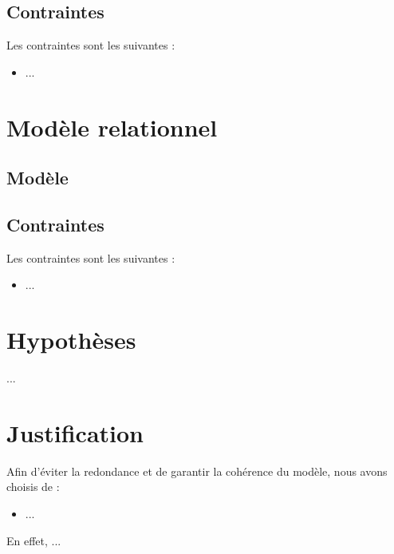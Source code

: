 \documentclass[10pt,a4paper]{article}
\begin{document}
\subsection{Contraintes}
Les contraintes sont les suivantes :
\begin{itemize}
  \item ...
\end{itemize}



\section{Modèle relationnel}
\subsection{Modèle}


\begin{description}

\end{description}

\subsection{Contraintes}

Les contraintes sont les suivantes :
\begin{itemize}
  \item ...
\end{itemize}

\section{Hypothèses}

...

\section{Justification}

Afin d'éviter la redondance et de garantir la cohérence du modèle, nous avons choisis de :
\begin{itemize}
  \item ...
\end{itemize}
En effet, ...
\end{document}
